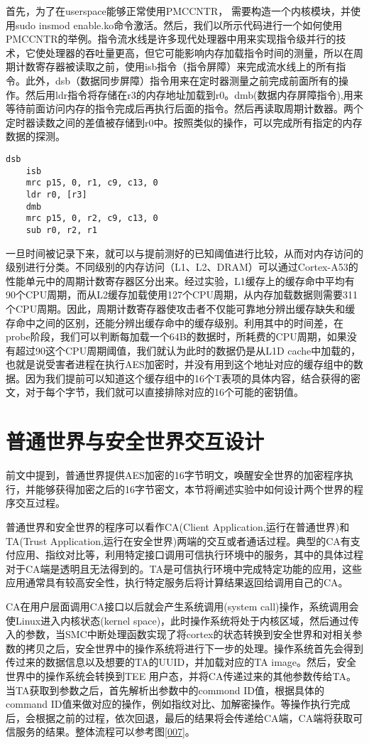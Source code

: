 首先，为了在userspace能够正常使用PMCCNTR， 需要构造一个内核模块，并使用sudo insmod enable.ko命令激活。然后，我们以所示代码进行一个如何使用PMCCNTR的举例。指令流水线是许多现代处理器中用来实现指令级并行的技术，它使处理器的吞吐量更高，但它可能影响内存加载指令时间的测量，所以在周期计数寄存器被读取之前，使用isb指令（指令屏障）来完成流水线上的所有指令。此外，dsb（数据同步屏障）指令用来在定时器测量之前完成前面所有的操作。然后用ldr指令将存储在r3的内存地址加载到r0。dmb(数据内存屏障指令),用来等待前面访问内存的指令完成后再执行后面的指令。然后再读取周期计数器。两个定时器读数之间的差值被存储到r0中。按照类似的操作，可以完成所有指定的内存数据的探测。


\begin{lstlisting}[language=assembly]
	dsb
	isb
	mrc p15, 0, r1, c9, c13, 0
	ldr r0, [r3]
	dmb
	mrc p15, 0, r2, c9, c13, 0
	sub r0, r2, r1
\end{lstlisting}

一旦时间被记录下来，就可以与提前测好的已知阈值进行比较，从而对内存访问的级别进行分类。不同级别的内存访问（L1、L2、DRAM）可以通过Cortex-A53的性能单元中的周期计数寄存器区分出来。经过实验，L1缓存上的缓存命中平均有90个CPU周期，而从L2缓存加载使用127个CPU周期，从内存加载数据则需要311个CPU周期。因此，周期计数寄存器使攻击者不仅能可靠地分辨出缓存缺失和缓存命中之间的区别，还能分辨出缓存命中的缓存级别。利用其中的时间差，在probe阶段，我们可以判断每加载一个64B的数据时，所耗费的CPU周期，如果没有超过90这个CPU周期阈值，我们就认为此时的数据仍是从L1D cache中加载的，也就是说受害者进程在执行AES加密时，并没有用到这个地址对应的缓存组中的数据。因为我们提前可以知道这个缓存组中的16个T表项的具体内容，结合获得的密文，对于每个字节，我们就可以直接排除对应的16个可能的密钥值。


\section{普通世界与安全世界交互设计}

前文中提到，普通世界提供AES加密的16字节明文，唤醒安全世界的加密程序执行，并能够获得加密之后的16字节密文，本节将阐述实验中如何设计两个世界的程序交互过程。

普通世界和安全世界的程序可以看作CA(Client Application,运行在普通世界)和TA(Trust Application,运行在安全世界)两端的交互或者通话过程。典型的CA有支付应用、指纹对比等，利用特定接口调用可信执行环境中的服务，其中的具体过程对于CA端是透明且无法得到的。TA是可信执行环境中完成特定功能的应用，这些应用通常具有较高安全性，执行特定服务后将计算结果返回给调用自己的CA。

CA在用户层面调用CA接口以后就会产生系统调用(system call)操作，系统调用会使Linux进入内核状态(kernel space)，此时操作系统将处于内核区域，然后通过传入的参数，当SMC中断处理函数实现了将cortex的状态转换到安全世界和对相关参数的拷贝之后，安全世界中的操作系统将进行下一步的处理。操作系统首先会得到传过来的数据信息以及想要的TA的UUID，并加载对应的TA image。然后，安全世界中的操作系统会转换到TEE 用户态，并将CA传递过来的其他参数传给TA。当TA获取到参数之后，首先解析出参数中的commond ID值，根据具体的command ID值来做对应的操作，例如指纹对比、加解密操作。等操作执行完成后，会根据之前的过程，依次回退，最后的结果将会传递给CA端，CA端将获取可信服务的结果。整体流程可以参考图\ref{007}。

